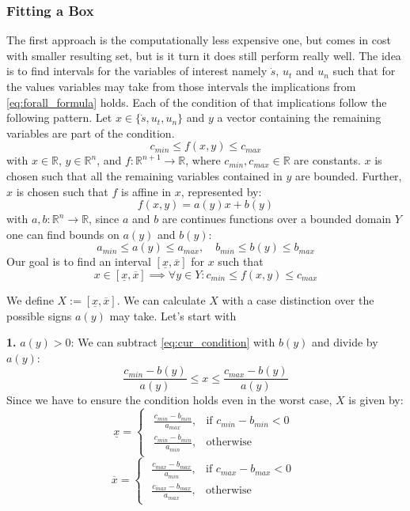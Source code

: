\subsubsection{Fitting a Box}

The first approach is the computationally less expensive one, but comes in cost with smaller resulting set, but is it turn it does still perform
really well.
The idea is to find intervals for the variables of interest namely $\dot{s}$, $u_t$ and $u_n$ such that for the values variables may take from those
intervals the implications from \ref{eq:forall_formula} holds.
Each of the condition of that implications follow the following pattern.
Let $x \in \{\dot{s}, u_t, u_n\}$ and $y$ a vector containing the remaining variables are part of the condition.
\begin{equation}
	\label{eq:cur_condition}
	c_{min} \leq f(x, y) \leq c_{max}
\end{equation}
with $x \in \mathbb{R}$, $y \in \mathbb{R}^n$, and $f: \mathbb{R}^{n+1} \to \mathbb{R}$, where $c_{min}, c_{max} \in \mathbb{R}$ are constants.
$x$ is chosen such that all the remaining variables contained in $y$ are bounded.
Further, $x$ is chosen such that $f$ is affine in $x$, represented by:
\begin{equation}
	f(x, y) = a(y) x + b(y)
\end{equation}
with $a, b : \mathbb{R}^n \to \mathbb{R}$, since $a$ and $b$ are continues functions over a bounded domain $Y$ one can find bounds on $a(y)$ and $b(y)$:
\begin{equation}
	a_{min} \leq a(y) \leq a_{max}, \quad b_{min} \leq b(y) \leq b_{max}
\end{equation}
Our goal is to find an interval $[\underline{x}, \overline{x}]$ for $x$ such that
\begin{equation}
	x\in [\underline{x}, \overline{x}] \implies \forall y\in Y: c_{min} \leq f(x, y) \leq c_{max}
\end{equation}

We define $X := [\underline{x}, \overline{x}]$.
We can calculate $X$ with a case distinction over the possible signs $a(y)$ may take.
Let's start with

\textbf{1.
}
$a(y) > 0$:
We can subtract \ref{eq:cur_condition} with $b(y)$ and divide by $a(y)$:
\[
	\frac{c_{min}-b(y)}{a(y)} \leq x \leq \frac{c_{max}-b(y)}{a(y)}
\]
Since we have to ensure the condition holds even in the worst case, $X$ is given by:
\[
	\underline{x} =
	\begin{cases}
		\begin{array}{ll}
			\frac{c_{min}-b_{min}}{a_{max}}, & \text{if } c_{min}-b_{min} < 0 \\[10pt]
			\frac{c_{min}-b_{min}}{a_{min}}, & \text{otherwise}
		\end{array}
	\end{cases}
\]
\[
	\overline{x} =
	\begin{cases}
		\begin{array}{ll}
			\frac{c_{max}-b_{max}}{a_{min}}, & \text{if } c_{max}-b_{max} < 0 \\[10pt]
			\frac{c_{max}-b_{max}}{a_{max}}, & \text{otherwise}
		\end{array}
	\end{cases}
\]

